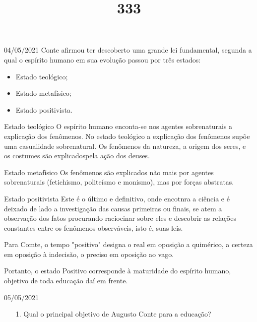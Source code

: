 \documentclass{SchoolBook}
\begin{document}
    \begin{day}{04/05/2021}
        Conte afirmou ter descoberto uma grande lei fundamental, segunda a qual o espírito humano em sua evolução passou por três estados:

        \vspace{6pt}
        \begin{itemize}[nosep]
            \item Estado teológico;
            \item Estado metafísico;
            \item Estado positivista.
        \end{itemize}

        \title{3}{Estado teológico}
        O espírito humano enconta-se nos agentes sobrenaturais a explicação dos fenômenos. No estado teológico a explicação dos fenômenos supõe uma casualidade sobrenatural. Os fenômenos da natureza, a origem dos seres, e os costumes são explicadospela ação dos deuses.

        \title{3}{Estado metafísico}
        Os fenômenos são explicados não mais por agentes sobrenaturais (fetichismo, politeísmo e monismo), mas por forças abstratas.

        \title{3}{Estado positivista}
        Este é o último e definitivo, onde encotnra a ciência e é deixado de lado a investigação das causas primeiras ou finais, se atem a observação dos fatos procurando raciocinar sobre eles e descobrir as relações constantes entre os fenômenos observáveis, isto é, suas leis.
        
        Para Comte, o tempo "positivo" designa o real em oposição a quimérico, a certeza em oposição à indecisão, o preciso em oposição ao vago.
        
        Portanto, o estado Positivo corresponde à maturidade do espírito humano, objetivo de toda educação daí em frente.
    \end{day}
    
    \begin{day}{05/05/2021}
        \begin{enumerate}
            \item[1.] Qual o principal objetivo de Augusto Conte para a educação?
        \end{enumerate}
    \end{day}
    
\end{document}

